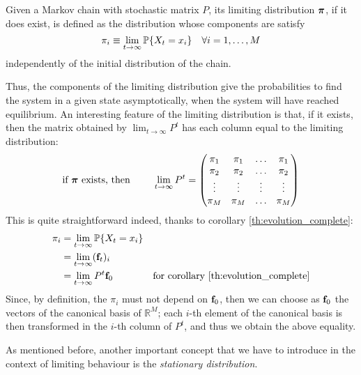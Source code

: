 \begin{ndef}
    Given a Markov chain with stochastic matrix $P$, its limiting distribution $\boldsymbol{\pi}$, if it does exist, is defined as the distribution whose components are satisfy
    \begin{equation}
        \pi_i \equiv \lim_{t \rightarrow \infty} \mathbb{P}\{X_t = x_i\} \quad \forall i=1,\dots,M
    \end{equation}
    independently of the initial distribution of the chain.
\end{ndef}
Thus, the components of the limiting distribution give the probabilities to find the system in a given state asymptotically, when the system will have reached equilibrium. An interesting feature of the limiting distribution is that, if it exists, then the matrix obtained by $\lim_{t \rightarrow \infty} P^t$ has each column equal to the limiting distribution:
\begin{equation}
    \text{if $\boldsymbol{\pi}$ exists, then } \quad \quad \lim_{t \rightarrow \infty} P^t =
    \begin{pmatrix}
        \pi_1  & \pi_1  & \dots  & \pi_1  \\
        \pi_2  & \pi_2  & \dots  & \pi_2  \\
        \vdots & \vdots & \vdots & \vdots \\
        \pi_M  & \pi_M  & \dots  & \pi_M
    \end{pmatrix}
\end{equation}
This is quite straightforward indeed, thanks to corollary \ref{th:evolution_complete}:
    \begin{align}
        \pi_i
         & = \lim_{t \rightarrow \infty} \mathbb{P}\{X_t = x_i\}                                                       \\
         & = \lim_{t \rightarrow \infty} (\mathbf{f}_t)_i                                                               \\
         & = \lim_{t \rightarrow \infty} P^t \mathbf{f}_0         & \text{for corollary \ref{th:evolution_complete}}
    \end{align}   
Since, by definition, the $\pi_i$ must not depend on $\mathbf{f}_0$, then we can choose as $\mathbf{f}_0$ the vectors of the canonical basis of $\mathbb{R}^M$; each $i$-th element of the canonical basis is then transformed in the $i$-th column of $P^t$, and thus we obtain the above equality.

\medskip
As mentioned before, another important concept that we have to introduce in the context of limiting behaviour is the \emph{stationary distribution}.

